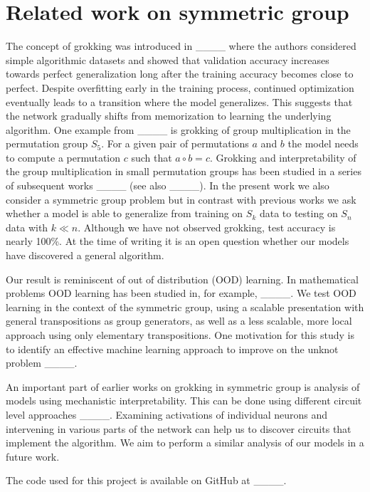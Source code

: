 \section{Related work on symmetric group}
The concept of grokking was introduced in ____ where the authors considered simple algorithmic datasets and showed that validation accuracy increases towards perfect generalization long after the training accuracy becomes close to perfect. Despite overfitting early in the training process, continued optimization eventually leads to a transition where the model generalizes. This suggests that the network gradually shifts from memorization to learning the underlying algorithm. One example from ____ is grokking of group multiplication in the permutation group $S_5$. For a given pair of permutations  $a$ and $b$ the model needs to compute a permutation $c$ such that $a\circ b = c$. Grokking and interpretability of the group multiplication in small permutation groups has been studied in a series of subsequent works ____ (see also ____). In the present work we also consider a symmetric group problem but in contrast with previous works we ask whether a model is able to generalize from training on $S_k$ data to testing on $S_n$ data with $k\ll n$. Although we have not observed grokking, test accuracy is nearly 100\%. At the time of writing it is an open question whether our models have discovered a general algorithm.

Our result is reminiscent of out of distribution (OOD) learning. In mathematical problems OOD learning has been studied in, for example, ____. We test OOD learning in the context of the symmetric group, using a scalable presentation with general transpositions as group generators, as well as a less scalable, more local approach using only elementary transpositions. One motivation for this study is to identify an effective machine learning approach to improve on the unknot problem ____.

An important part of earlier works on grokking in symmetric group is analysis of models using mechanistic interpretability. This can be done using different circuit level approaches ____. Examining activations of individual neurons and intervening in various parts of the network can help us to discover circuits that implement the algorithm. We aim to perform a similar analysis of our models in a future work.

The code used for this project is available on GitHub at ____.
